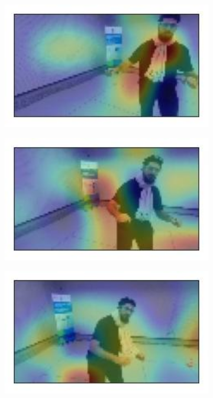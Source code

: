 \begin{figure}[!h]
\begin{center}
\begin{subfigure}[h]{0.24\textwidth}
		\end{subfigure}
		\hfill
		\begin{subfigure}[h]{0.24\textwidth}
			\centering
			\includegraphics[width=1\textwidth]{"contents/images/gradcam/gradcam-beard-07"}
		\end{subfigure}
		\hfill
		\begin{subfigure}[h]{0.24\textwidth}
			\centering
			\includegraphics[width=1\textwidth]{"contents/images/gradcam/gradcam-beard-08"}
		\end{subfigure}
		\vfill
		\begin{subfigure}[h]{0.24\textwidth}
			\centering
			\includegraphics[width=1\textwidth]{"contents/images/gradcam/gradcam-beard-09"}

\end{subfigure}
\end{center}
\end{figure}

